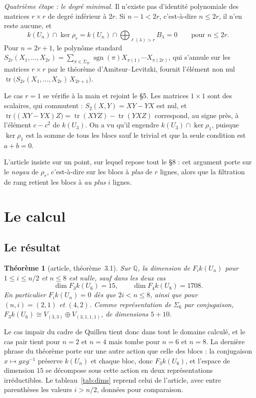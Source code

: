 \documentclass[11pt,a4paper]{amsart}
\theoremstyle{definition}
\theoremstyle{plain}
\newtheorem{theoreme}{Théorème}
\theoremstyle{remark}
\newcommand{\Q}{\mathbb Q}
\newcommand{\sgn}{\operatorname{sgn}}
\newcommand{\tr}{\operatorname{tr}}
\begin{document}
\emph{Quatrième étape : le degré minimal.} Il n'existe pas d'identité polynomiale des matrices $r \times r$ de degré inférieur à $2r$. Si $n - 1 < 2r$, c'est-à-dire $n \le 2r$, il n'en reste aucune, et
\[
k(U_n) \cap \ker \rho_r = k(U_n) \cap \bigoplus_{\ell(\lambda) > r} B_\lambda = 0 \qquad \text{pour } n \le 2r.
\]
Pour $n = 2r + 1$, le polynôme standard $S_{2r}(X_1, \dots, X_{2r}) = \sum_{\pi \in \Sigma_{2r}} \sgn(\pi) X_{\pi(1)} \cdots X_{\pi(2r)}$, qui s'annule sur les matrices $r \times r$ par le théorème d'Amitsur--Levitzki, fournit l'élément non nul $\tr\bigl(S_{2r}(X_1, \dots, X_{2r})\, X_{2r+1}\bigr)$.

Le cas $r = 1$ se vérifie à la main et rejoint le \S5. Les matrices $1 \times 1$ sont des scalaires, qui commutent : $S_2(X, Y) = XY - YX$ est nul, et $\tr\bigl((XY - YX)Z\bigr) = \tr(XYZ) - \tr(YXZ)$ correspond, au signe près, à l'élément $c - c^2$ de $k(U_3)$. On a vu qu'il engendre $k(U_3) \cap \ker \rho_1$, puisque $\ker \rho_1$ est la somme de tous les blocs sauf le trivial et que la seule condition est $a + b = 0$.

L'article insiste sur un point, sur lequel repose tout le \S8 : cet argument porte sur le \emph{noyau} de $\rho_r$, c'est-à-dire sur les blocs à \emph{plus} de $r$ lignes, alors que la filtration de rang retient les blocs à \emph{au plus} $i$ lignes.

\section{Le calcul}

\subsection{Le résultat}

\begin{theoreme}[article, théorème~3.1]
Sur $\Q$, la dimension de $F_i k(U_n)$ pour $1 \le i \le n/2$ et $n \le 8$ est nulle, sauf dans les deux cas
\[
\dim F_3 k(U_6) = 15, \qquad \dim F_4 k(U_8) = 1708 .
\]
En particulier $F_i k(U_n) = 0$ dès que $2i < n \le 8$, ainsi que pour $(n, i) = (2, 1)$ et $(4, 2)$. Comme représentation de $\Sigma_6$ par conjugaison, $F_3 k(U_6) \cong V_{(3,3)} \oplus V_{(3,1,1,1)}$, de dimensions $5 + 10$.
\end{theoreme}

Le cas impair du cadre de Quillen tient donc dans tout le domaine calculé, et le cas pair tient pour $n = 2$ et $n = 4$ mais tombe pour $n = 6$ et $n = 8$. La dernière phrase du théorème porte sur une autre action que celle des blocs : la conjugaison $x \mapsto g x g^{-1}$ préserve $k(U_n)$ et chaque bloc, donc $F_3 k(U_6)$, et l'espace de dimension $15$ se décompose sous cette action en deux représentations irréductibles. Le tableau~\ref{tab:dims} reprend celui de l'article, avec entre parenthèses les valeurs $i > n/2$, données pour comparaison.
\end{document}
